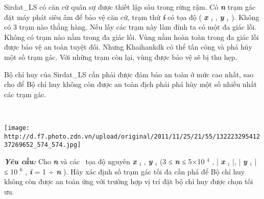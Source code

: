 Sirdat\_LS có căn cứ quân sự được thiết lập sâu trong rừng rậm. Có \textbf{\emph{ n }} trạm gác đặt máy phát siêu âm để bảo vệ căn cứ, trạm thứ \textbf{\emph{ i }} có tọa độ ( \textbf{\emph{ x $_ i $}} , \textbf{\emph{ y $_ i $}} ). Không có 3 trạm nào thẳng hàng. Nếu lấy các trạm này làm đỉnh ta có một đa giác lồi. Không có trạm nào nằm trong đa giác lồi. Vùng nằm hoàn toàn trong đa giác lồi được bảo vệ an toàn tuyệt đối. Nhưng Khaihankdk có thể tấn công và phá hủy một số trạm gác. Với những trạm còn lại, vùng được bảo vệ sẽ bị thu hẹp.

Bộ chỉ huy của Sirdat\_LS cần phải được đảm bảo an toàn ở mức cao nhất, sao cho để Bộ chỉ huy không còn được an toàn địch phải phá hủy một số nhiều nhất các trạm gác.

 


\texttt{[image: http://d.f7.photo.zdn.vn/upload/original/2011/11/25/21/55/13222329541237269652\_574\_574.jpg]}

\textbf{\emph{Yêu cầu: }} Cho \textbf{\emph{ n }} và các  tọa độ nguyên \textbf{\emph{ x $_ i $}} , \textbf{\emph{ y $_ i $}} (3 ≤ \textbf{\emph{ n }} ≤ 5×10 $^ 4 $ , | \textbf{\emph{ x $_ i $}} |, | \textbf{\emph{ y $_ i $}} | ≤ 10 $^ 6 $ , \textbf{\emph{ i }} = 1 ÷ \textbf{\emph{ n }} ). Hãy xác định số trạm gác tối đa cần phá để Bộ chỉ huy không còn được an toàn ứng với trường hợp vị trí đặt bộ chỉ huy được chọn tối ưu.

\